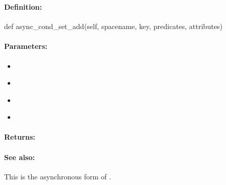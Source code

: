 \pagebreak
\subsubsection{}
\label{api:python:async_cond_set_add}


\paragraph{Definition:}
\begin{pythoncode}
def async_cond_set_add(self, spacename, key, predicates, attributes)
\end{pythoncode}

\paragraph{Parameters:}
\begin{itemize}[noitemsep]
\item {}\\

\item {}\\

\item {}\\

\item {}\\

\end{itemize}

\paragraph{Returns:}


\paragraph{See also:}  This is the asynchronous form of .

\pagebreak
\subsubsection{}
\label{api:python:set_remove}


